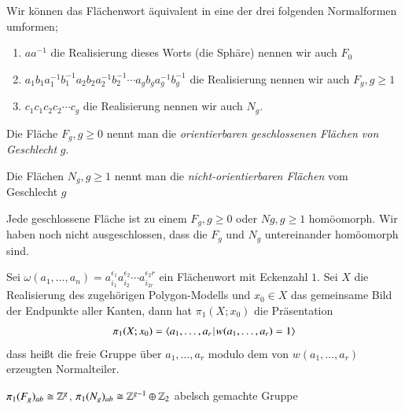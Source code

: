 \documentclass[a4paper,10pt]{scrartcl}
\begin{document}
\begin{note*}[Endergebnis]
 Wir können das Flächenwort äquivalent in eine der drei folgenden Normalformen umformen;
 \begin{enumerate}[(1)]
  \item $aa^{-1}$ die Realisierung dieses Worts  (die Sphäre) nennen wir auch $F_0$
  \item $a_1b_1a_1^{-1} b_1^{-1} a_2 b_2a_2^{-1} b_2^{-1}\dotsb a_gb_g a_g^{-1} b_g^{-1}$ die Realisierung nennen wir auch $F_g, g\ge 1$
  \item $c_1c_1c_2c_2\dotsb c_g$ die Realisierung nennen wir auch $N_g$.
 \end{enumerate}
Die Fläche $F_g, g\ge 0$ nennt man die \emph{orientierbaren geschlossenen Flächen von Geschlecht} $g$.
\begin{figure}[H]
 \centering
\fixme[fig151]
\caption{}
\end{figure}
Die Flächen $N_g, g\ge 1$ nennt man die \emph{nicht-orientierbaren Flächen} vom Geschlecht $g$
\begin{figure}[H]
 \centering
\fixme[fig152]
\caption{}
\end{figure}
\end{note*}
\begin{st}
 Jede geschlossene Fläche ist zu einem $F_g, g\ge 0$ oder $Ng, g\ge 1$ homöomorph. Wir haben noch nicht ausgeschlossen, dass die $F_g$ und $N_g$ untereinander homöomorph sind.
\end{st}
\begin{st}
 Sei $\omega(a_1,\dotsc  ,a_n)=a^{\epsilon_1}_{i_1} a^{\epsilon_2}_{i_2}\dotsb  a^{\epsilon_2r}_{i_{2r}}$ ein Flächenwort mit Eckenzahl $1$. Sei $X$ die Realisierung des zugehörigen Polygon-Modells und $x_0\in X$ das gemeinsame Bild der Endpunkte aller Kanten, dann hat $\pi_1(X;x_0)$ die Präsentation
\[
 \pi_1(X;x_0)=\langle a_1,\dotsc,a_r \, \vline \, w(a_1,\dotsc  ,a_r)=1\rangle
\]
dass heißt die freie Gruppe über $a_1,\dotsc  , a_r$ modulo dem von $w(a_1,\dotsc, a_r)$ erzeugten Normalteiler.
\begin{kor*}
 $\pi_1(F_g)_{ab}\cong \mathbb{Z}^g$, $\pi_1(N_g)_{ab}\cong \mathbb{Z}^{g-1} \oplus \mathbb{Z}_2$ abelsch gemachte Gruppe
\end{kor*}
\end{st}
\end{document}
